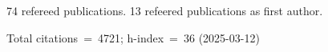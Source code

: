74 refereed publications. 13 refeered publications as first author.

Total citations~=~4721; h-index~=~36 (2025-03-12)
